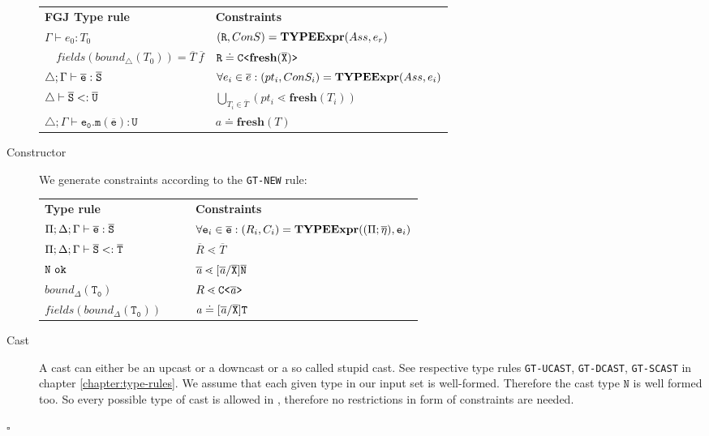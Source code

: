 \begin{description}
 \begin{tabular}{l|l}
   \textbf{FGJ Type rule} & \textbf{Constraints} \\
   $\Gamma \vdash e_0:T_0$ & $(\texttt{R}, ConS) = \textbf{TYPEExpr}(Ass, e_r)$\\ 
   $\quad \mathit{fields}(\mathit{bound}_\triangle(T_0)) = \overline{T} \ \overline{f}$ & $\texttt{R} \doteq \mathtt{C \texttt{<} \textbf{fresh}(\overline{\tt X}) \texttt{>} }$ \\
  $\triangle; \Gamma \vdash \overline{\tt e} : \overline{\tt S}$ & $\forall e_i \in \overline{e} : (pt_i, ConS_i) = \textbf{TYPEExpr}(Ass, e_i)$\\
  $\triangle \vdash \overline{\tt S} <: \overline{\tt U}$ & $ \bigcup_{T_i \in \overline{T}} (pt_i \lessdot \textbf{fresh}(T_i))$\\
  $\triangle; \Gamma \vdash \mathtt{e_0.m(\overline{e}) : U }$ & $a \doteq \textbf{fresh}(T)$ \\
 \end{tabular}
 \fi
 \item[Constructor] We generate constraints according to the \texttt{GT-NEW} rule:\\
 \begin{tabularx}{\linewidth}{lX|Xl}
  \textbf{\TFGJ{} Type rule} &&& \textbf{Constraints} \\
  $\Pi;\Delta;\Gamma \vdash \overline{\tt e} : \overline{\tt S}$ &&& $\forall \texttt{e}_i \in \overline{\texttt{e}} : (R_i, C_i) = \textbf{TYPEExpr}(({\Pi} ;
  \overline{\mathtt{\eta}}), \texttt{e}_i)$\\
  $\Pi;\Delta;\Gamma \vdash \overline{\tt S} <: \overline{\tt T}$ &&& $\overline{R} \lessdot \overline{T}$\\
  $\type{N}\ \texttt{ok}$ &&& $\overline{\mathit{ a }} \lessdot
  [\overline{\mathit{ a }}/\overline{\tt X}]\overline{\tt N}$\\
  $\mathtt{\mathit{bound}_\Delta (T_0)}$ &&& ${R} \lessdot \mathtt{C \texttt{<} \overline{\tt \mathit{ a }} \texttt{>} }$ \\
  $\mathtt{\mathit{fields}(\mathit{bound}_\Delta (T_0))}$ &&& $\mathit{ a } \doteq [\overline{\mathit{ a }}/\overline{\tt X}]\texttt{T}$
\end{tabularx}

\item[Cast]
A cast can either be an upcast or a downcast or a so called stupid cast.
See respective type rules \texttt{GT-UCAST}, \texttt{GT-DCAST}, \texttt{GT-SCAST} in chapter \ref{chapter:type-rules}.
We assume that each given type in our input set is well-formed.
Therefore the cast type $\mathtt{N}$ is well formed too.
So every possible type of cast is allowed in \TFGJ, therefore no restrictions in form of constraints are needed.

\end{description}

\hfill $\square$

